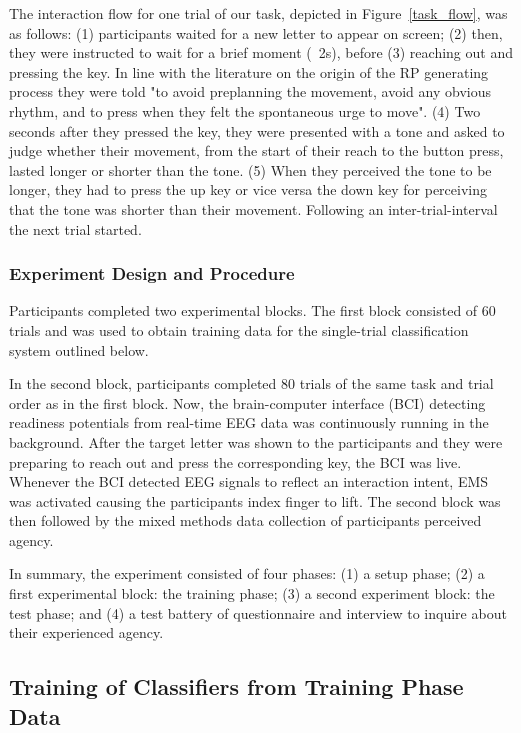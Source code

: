 The interaction flow for one trial of our task, depicted in Figure~\ref{task_flow}, was as follows: (1) participants waited for a new letter to appear on screen; (2) then, they were instructed to wait for a brief moment (~2s), before (3) reaching out and pressing the key. In line with the literature on the origin of the RP generating process they were told "to avoid preplanning the movement, avoid any obvious rhythm, and to press when they felt the spontaneous urge to move". (4) Two  seconds after they pressed the key, they were presented with a tone and asked to judge whether their movement, from the start of their reach to the button press, lasted longer or shorter than the tone. (5) When they perceived the tone to be longer, they had to press the up key or vice versa the down key for perceiving that the tone was shorter than their movement. Following an inter-trial-interval the next trial started.

\subsubsection{Experiment Design and Procedure}
Participants completed two experimental blocks. The first block consisted of 60 trials and was used to obtain training data for the single-trial classification system outlined below. 

In the second block, participants completed 80 trials of the same task and trial order as in the first block. Now, the brain-computer interface (BCI) detecting readiness potentials from real-time EEG data was continuously running in the background. After the target letter was shown to the participants and they were preparing to reach out and press the corresponding key, the BCI was live. Whenever the BCI detected EEG signals to reflect an interaction intent, EMS was activated causing the participants index finger to lift. The second block was then followed by the mixed methods data collection of participants perceived agency. 

In summary, the experiment consisted of four phases: (1) a setup phase; (2) a first experimental block: the training phase; (3) a second experiment block: the test phase; and (4) a test battery of questionnaire and interview to inquire about their experienced agency.

\subsection{Training of Classifiers from Training Phase Data}

